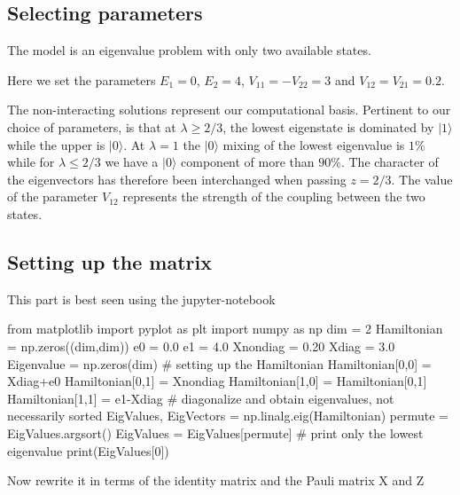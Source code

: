 \documentclass[%
oneside,                 %
final,                   %
10pt]{article}
\begin{document}
\subsection{Selecting parameters}

The model is an eigenvalue problem with only
two available states.

Here we set the parameters $E_1=0$,
$E_2=4$, $V_{11}=-V_{22}=3$ and $V_{12}=V_{21}=0.2$.

The non-interacting solutions represent our computational basis.
Pertinent to our choice of parameters, is that at $\lambda\geq 2/3$,
the lowest eigenstate is dominated by $\vert 1\rangle$ while the upper
is $\vert 0 \rangle$. At $\lambda=1$ the $\vert 0 \rangle$ mixing of
the lowest eigenvalue is $1\%$ while for $\lambda\leq 2/3$ we have a
$\vert 0 \rangle$ component of more than $90\%$.  The character of the
eigenvectors has therefore been interchanged when passing $z=2/3$. The
value of the parameter $V_{12}$ represents the strength of the coupling
between the two states.

\subsection{Setting up the matrix}
This part is best seen using the jupyter-notebook






















\bpycod
from  matplotlib import pyplot as plt
import numpy as np
dim = 2
Hamiltonian = np.zeros((dim,dim))
e0 = 0.0
e1 = 4.0
Xnondiag = 0.20
Xdiag = 3.0
Eigenvalue = np.zeros(dim)
# setting up the Hamiltonian
Hamiltonian[0,0] = Xdiag+e0
Hamiltonian[0,1] = Xnondiag
Hamiltonian[1,0] = Hamiltonian[0,1]
Hamiltonian[1,1] = e1-Xdiag
# diagonalize and obtain eigenvalues, not necessarily sorted
EigValues, EigVectors = np.linalg.eig(Hamiltonian)
permute = EigValues.argsort()
EigValues = EigValues[permute]
# print only the lowest eigenvalue
print(EigValues[0])

\epycod


Now rewrite it in terms of the identity matrix and the Pauli matrix X and Z
\end{document}
